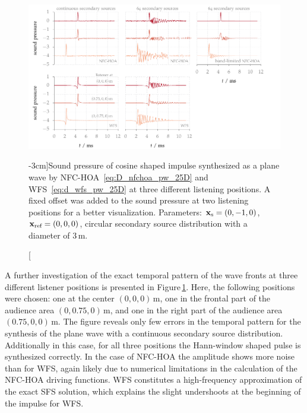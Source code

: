 \begin{figure}[tb]
    \vspace{-0.5cm}
    \includegraphics{fig3_14/fig3_14}
    \caption[][-3cm]{Sound pressure of cosine shaped impulse synthesized as a
    plane wave by \ac{NFC-HOA}~\protect\eqref{eq:D_nfchoa_pw_25D} and
    \ac{WFS}~\protect\eqref{eq:d_wfs_pw_25D} at three different listening
    positions. A fixed offset was added to the sound pressure at two listening
    positions for a better visualization.
    Parameters: $\mathbf{x}_\text{s} = (0,-1,0)$, $\mathbf{x}_\text{ref}=(0,0,0)$, circular secondary source
    distribution with a diameter of $3$\,m.
    }
    \label{fig:sound_field_imp_fixed}
\end{figure}
%
A further investigation of the exact temporal pattern of the wave
fronts at three different listener positions is presented in
Figure\,\ref{fig:sound_field_imp_fixed}. Here, the following positions were
chosen: one at the center
$(0,0,0)$\,m, one in the frontal part of the audience area $(0,0.75,0)$\,m, and
one in the right part of the audience area $(0.75,0,0)$\,m. The
figure reveals only few errors in the temporal pattern for the synthesis of
the plane wave with a continuous secondary source distribution.
Additionally in this case, for all three positions the Hann-window shaped pulse is synthesized
correctly. In the case of \ac{NFC-HOA} the amplitude shows more noise than
for \ac{WFS},
again likely due to numerical limitations in the calculation of the \ac{NFC-HOA}
driving functions.
\ac{WFS} constitutes a high-frequency approximation of the exact \ac{SFS}
solution, which explains the slight undershoots at the beginning of the impulse
for \ac{WFS}.

